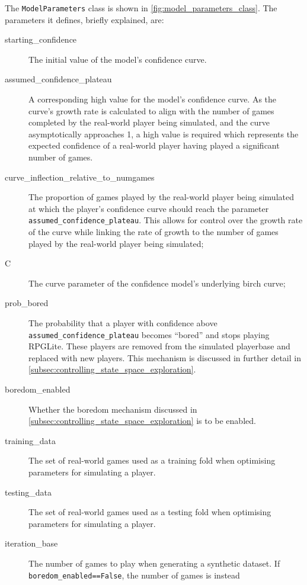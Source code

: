 The \lstinline{ModelParameters} class is shown in
\cref{fig:model_parameters_class}. The parameters it defines, briefly explained,
are:

\begin{description}
  \item[starting\_confidence] The initial value of the model's confidence curve.
  \item[assumed\_confidence\_plateau] A corresponding high value for the model's
  confidence curve. As the curve's growth rate is calculated to align with the
  number of games completed by the real-world player being simulated, and the
  curve asymptotically approaches 1, a high value is required which represents
  the expected confidence of a real-world player having played a significant
  number of games.
  \item[curve\_inflection\_relative\_to\_numgames] The proportion of games played by
  the real-world player being simulated at which the player's confidence
  curve should reach the parameter \lstinline{assumed_confidence_plateau}. This
  allows for control over the growth rate of the curve while linking the rate of
  growth to the number of games played by the real-world player being simulated;
  \item[C] The curve parameter of the confidence model's underlying birch curve;
  \item[prob\_bored] The probability that a player with confidence above
  \lstinline{assumed_confidence_plateau} becomes ``bored'' and stops playing
  RPGLite. These players are removed from the simulated playerbase and replaced
  with new players. This mechanism is discussed in further detail in
  \cref{subsec:controlling_state_space_exploration}.
  \item[boredom\_enabled] Whether the boredom mechanism discussed in
  \cref{subsec:controlling_state_space_exploration} is to be enabled.
  \item[training\_data] The set of real-world games used as a training fold when
  optimising parameters for simulating a player.
  \item[testing\_data] The set of real-world games used as a testing fold when
  optimising parameters for simulating a player.
  \item[iteration\_base] The number of games to play when generating a synthetic
  dataset. If \lstinline{boredom_enabled==False}, the number of games is instead

\end{description}
